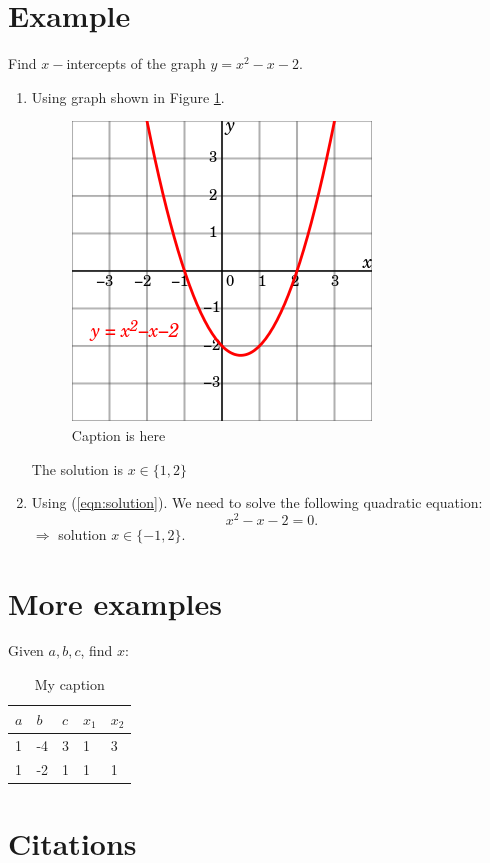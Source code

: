 \documentclass[10pt]{article}
\begin{document}
\section{Example} %
\label{sec:example}
Find $x-$intercepts of the graph $y = x^2 - x - 2$.
\\
\begin{enumerate}
	\item Using graph shown in Figure \ref{fig:graph1}. \\
	\begin{figure}[!h]  		 
	\label{fig:graph1}
	\centering
	 	\includegraphics[scale = .3]{figs/fig1.png} 
	 	\caption{Caption is here}
	\end{figure}
	The solution is $x \in \{1, 2\}$
	\item Using (\ref{eqn:solution}). 
	We need to solve the following quadratic equation: 
	\begin{equation}
	    x^2 - x - 2 = 0.
	\end{equation}
	$\Rightarrow$ solution $x \in \{-1, 2\}$.
\end{enumerate}

\section{More examples} %
\label{sec:more_examples}
Given $a, b, c$, find $x$:

\begin{table}[!h]
\centering
\caption{My caption}
\label{my-label}
\begin{tabular}{|l|l|l||l|l|}
\hline
$a$ & $b$  & $c$ & $x_1$ & $x_2$ \\ \hline \hline 
1 & -4 & 3 & 1    & 3    \\ \hline
1 & -2 & 1 & 1    & 1    \\ \hline
\end{tabular}
\end{table}

\section{Citations} %
\label{sec:citations}

\cite{vu2015dfdl}






\end{document}
